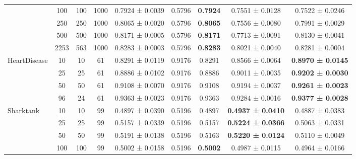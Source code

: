 \begin{table}
{\begin{tabular}[H]{@{}lcccccccc@{}}
                              & 100   & 100  & 1000 & 0.7924 ± 0.0039      & 0.5796                & \textbf{0.7924} & 0.7551 ± 0.0128          & 0.7522 ± 0.0246          \\
                              & 250   & 250  & 1000 & 0.8065 ± 0.0020      & 0.5796                & \textbf{0.8065} & 0.7556 ± 0.0080          & 0.7991 ± 0.0029          \\
                              & 500   & 500  & 1000 & 0.8171 ± 0.0005      & 0.5796                & \textbf{0.8171} & 0.7713 ± 0.0091          & 0.8130 ± 0.0041          \\
                              & 2253  & 563  & 1000 & 0.8283 ± 0.0003      & 0.5796                & \textbf{0.8283} & 0.8021 ± 0.0040          & 0.8281 ± 0.0004          \\
                              \midrule
\multirow{4}{*}{HeartDisease} & 10    & 10   & 61   & 0.8291 ± 0.0119      & 0.9176                & 0.8291          & 0.8566 ± 0.0064          & \textbf{0.8970 ± 0.0145} \\
                              & 25    & 25   & 61   & 0.8886 ± 0.0102      & 0.9176                & 0.8886          & 0.9011 ± 0.0035          & \textbf{0.9202 ± 0.0030} \\
                              & 50    & 50   & 61   & 0.9108 ± 0.0070      & 0.9176                & 0.9108          & 0.9194 ± 0.0037          & \textbf{0.9261 ± 0.0023} \\
                              & 96    & 24   & 61   & 0.9363 ± 0.0023      & 0.9176                & 0.9363          & 0.9284 ± 0.0016          & \textbf{0.9377 ± 0.0028} \\
                              \midrule
\multirow{5}{*}{Sharktank}    & 10    & 10   & 99   & 0.4897 ± 0.0390      & 0.5196                & 0.4897          & \textbf{0.4937 ± 0.0410} & 0.4887 ± 0.0383          \\
                              & 25    & 25   & 99   & 0.5157 ± 0.0339      & 0.5196                & 0.5157          & \textbf{0.5224 ± 0.0366} & 0.5063 ± 0.0331          \\
                              & 50    & 50   & 99   & 0.5191 ± 0.0138      & 0.5196                & 0.5163          & \textbf{0.5220 ± 0.0124} & 0.5110 ± 0.0049          \\
                              & 100   & 100  & 99   & 0.5002 ± 0.0158      & 0.5196                & \textbf{0.5002} & 0.4987 ± 0.0115          & 0.4964 ± 0.0166          \\

\end{tabular}}
\end{table}
